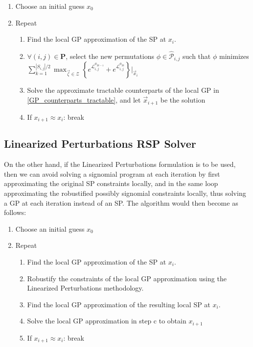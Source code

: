 \begin{enumerate}
    \item Choose an initial guess $x_0$
    \item Repeat
    \begin{enumerate}
        \item Find the local GP approximation of the SP at $x_i$.
        \item $\forall (i,j) \in \mathbf{P}$, select the new permutations $\phi \in \hat{\mathcal{P}}_{i,j}$ such that $\phi$ minimizes $\textstyle{\sum}_{k=1}^{|S_{i,j}|/2} {\displaystyle \max_{\vec{\zeta} \in \mathcal{Z}}} \left\{e^{\mathcal{L}^{\phi_{2k-1}}_{i,j}} + e^{\mathcal{L}^{\phi_{2k}}_{i,j}}\right\}\bigg\rvert_{\vec{x}_i}$
        \item Solve the approximate tractable counterparts of the local GP in \eqref{GP_counterparts_tractable}, and let $\vec{x}_{i+1}$ be the solution
        \item If $x_{i+1} \approx x_{i}$: break
    \end{enumerate}
\end{enumerate}

\subsection{Linearized Perturbations RSP Solver}
On the other hand, if the Linearized Perturbations formulation is to be used, then we can avoid solving a signomial program at each iteration by first approximating the original SP constraints locally, and in the same loop approximating the robustified possibly signomial constraints locally, thus solving a GP at each iteration instead of an SP. The algorithm would then become as follows:

\begin{enumerate}
    \item Choose an initial guess $x_0$
    \item Repeat
    \begin{enumerate}
        \item Find the local GP approximation of the SP at $x_i$.
        \item Robustify the constraints of the local GP approximation using the Linearized Perturbations methodology.
        \item Find the local GP approximation of the resulting local SP at $x_i$.
        \item Solve the local GP approximation in step c to obtain $x_{i+1}$
        \item If $x_{i+1} \approx x_{i}$: break
    \end{enumerate}
\end{enumerate}
